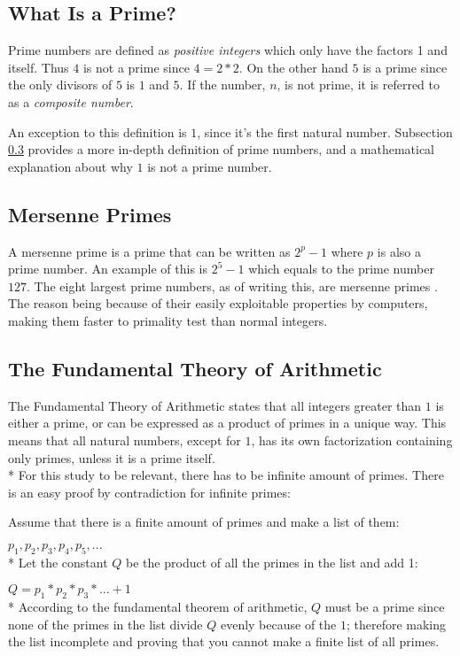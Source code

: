 \documentclass[main.tex]{subfiles}
\begin{document}
\subsection{What Is a Prime?}
Prime numbers are defined as \textit{positive integers} which only have the
factors 1 and itself. Thus $4$ is not a prime since $4 = 2 * 2$. On the other
hand $5$ is a prime since the only divisors of $5$ is $1$ and $5$. If the
number, $n$, is not prime, it is referred to as a \textit{composite number}.

An exception to this definition is $1$, since it's the first natural number.
Subsection \ref{arithmetic} provides a more in-depth definition of prime
numbers, and a mathematical explanation about why $1$ is not a prime number.

\subsection{Mersenne Primes}
A mersenne prime is a prime that can be written as $2^{p}-1$ where $p$ is also a
prime number. An example of this is $2^5-1$ which equals to the prime number
$127$. The eight largest prime numbers, as of writing this, are mersenne primes
\cite{prime:largest_digits}. The reason being because of their easily
exploitable properties by computers, making them faster to primality test than
normal integers.

\subsection{The Fundamental Theory of Arithmetic} \label{arithmetic} The
Fundamental Theory of Arithmetic \cite{theorem:arithmetic} states that all
integers greater than $1$ is either a prime, or can be expressed as a product of
primes in a unique way. This means that all natural numbers, except for $1$, has
its own factorization containing only primes, unless it is a prime itself.
\newline
\\*
For this study to be relevant, there has to be infinite amount of primes. There
is an easy proof by contradiction for infinite primes:

\begin{mdframed}
  Assume that there is a finite amount of primes and make a list of them:

  $p_1, p_2, p_3, p_4, p_5, ...$ \newline
  \\*
  Let the constant $Q$ be the product of all the primes in the list and add 1:

  $Q = p_1 * p_2 * p_3 * ... + 1$ \newline
  \\*
  According to the fundamental theorem of arithmetic, $Q$ must be a prime since
  none of the primes in the list divide $Q$ evenly because of the $1$; therefore
  making the list incomplete and proving that you cannot make a finite list of
  all primes.
\end{mdframed}
\end{document}
